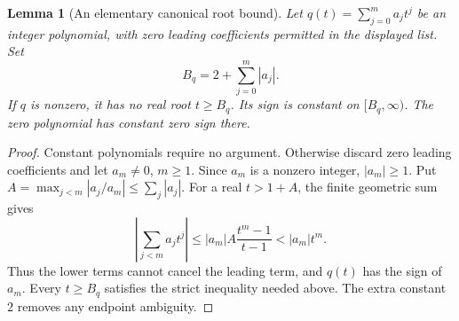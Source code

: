 \documentclass[11pt,a4paper]{article}
\newtheorem{lemma}[lemma]{Lemma}
\theoremstyle{definition}
\theoremstyle{remark}
\begin{document}
\begin{lemma}[An elementary canonical root bound]
\label{cdc:pt:lem:root-bound}
Let $q(t)=\sum_{j=0}^m a_jt^j$ be an integer polynomial, with zero leading
coefficients permitted in the displayed list. Set
\[
 B_q=2+\sum_{j=0}^m|a_j|.
\]
If $q$ is nonzero, it has no real root $t\geq B_q$. Its sign is constant
on $[B_q,\infty)$. The zero polynomial has constant zero sign there.
\end{lemma}
\begin{proof}
Constant polynomials require no argument. Otherwise discard zero leading
coefficients and let $a_m\neq0$, $m\geq1$. Since $a_m$ is a nonzero
integer, $|a_m|\geq1$. Put
$A=\max_{j<m}|a_j/a_m|\leq\sum_j|a_j|$.
For a real $t>1+A$, the finite geometric sum gives
\[
 \left|\sum_{j<m}a_jt^j\right|
 \leq |a_m| A\frac{t^m-1}{t-1}
 < |a_m|t^m.
\]
Thus the lower terms cannot cancel the leading term, and $q(t)$ has the
sign of $a_m$. Every $t\geq B_q$ satisfies the strict inequality needed
above. The extra constant $2$ removes any endpoint ambiguity.
\end{proof}
\end{document}
